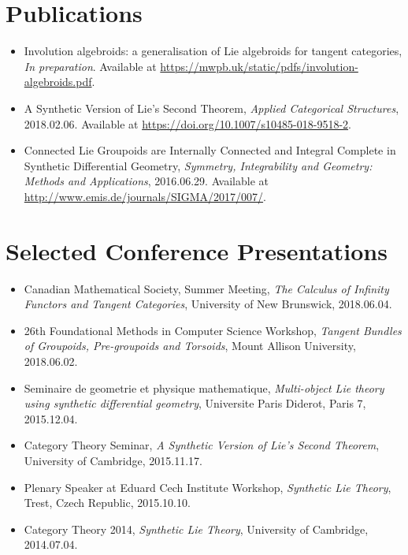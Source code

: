 \documentclass[a4paper,10pt]{article}
\begin{document}
\section{Publications}

\begin{itemize}
  \item Involution algebroids: a generalisation of Lie algebroids for tangent categories, \emph{In preparation}. Available at \url{https://mwpb.uk/static/pdfs/involution-algebroids.pdf}.
    \item A Synthetic Version of Lie's Second Theorem, \emph{Applied Categorical Structures}, 2018.02.06. Available at \url{https://doi.org/10.1007/s10485-018-9518-2}.
    \item Connected Lie Groupoids are Internally Connected and Integral Complete in Synthetic Differential Geometry, \emph{Symmetry, Integrability and Geometry: Methods and Applications}, 2016.06.29. Available at \url{http://www.emis.de/journals/SIGMA/2017/007/}.
\end{itemize}

\section{Selected Conference Presentations}

\begin{itemize}
	\item Canadian Mathematical Society, Summer Meeting, \emph{The Calculus of Infinity Functors and Tangent Categories}, University of New Brunswick, 2018.06.04.
    \item 26th Foundational Methods in Computer Science Workshop, \emph{Tangent Bundles of Groupoids, Pre-groupoids and Torsoids}, Mount Allison University, 2018.06.02.
    \item Seminaire de geometrie et physique mathematique, \emph{Multi-object Lie theory using synthetic differential geometry}, Universite Paris Diderot, Paris 7, 2015.12.04.
    \item Category Theory Seminar, \emph{A Synthetic Version of Lie's Second Theorem}, University of Cambridge, 2015.11.17.
    \item Plenary Speaker at Eduard Cech Institute Workshop, \emph{Synthetic Lie Theory}, Trest, Czech Republic, 2015.10.10.
    \item Category Theory 2014, \emph{Synthetic Lie Theory}, University of Cambridge, 2014.07.04.
\end{itemize}
\end{document}
